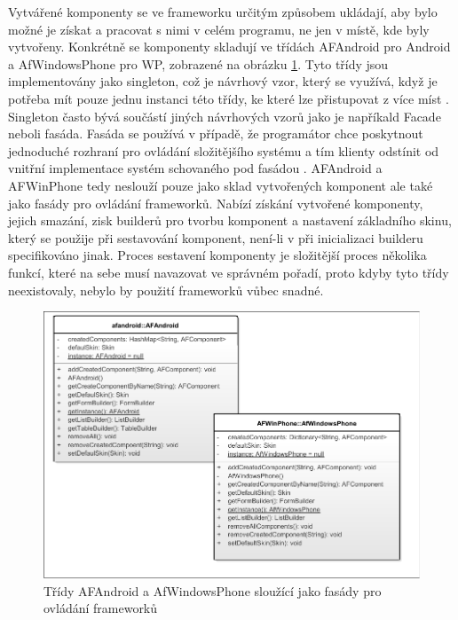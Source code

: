 Vytvářené komponenty se ve frameworku určitým způsobem ukládají, aby bylo možné je získat a pracovat s nimi v celém programu, ne jen v místě, kde byly vytvořeny. Konkrétně se komponenty skladují ve třídách AFAndroid pro Android a AfWindowsPhone pro WP, zobrazené na obrázku \ref{img:facades}. Tyto třídy jsou implementovány jako singleton, což je návrhový vzor, který se využívá, když je potřeba mít pouze jednu instanci této třídy, ke které lze přistupovat z více míst \cite{gamma}. Singleton často bývá součástí jiných návrhových vzorů jako je napříkald Facade neboli fasáda. Fasáda se používá v případě, že programátor chce poskytnout jednoduché rozhraní pro ovládání složitějšího systému a tím klienty odstínit od vnitřní implementace systém schovaného pod fasádou \cite{gamma}. AFAndroid a AFWinPhone tedy neslouží pouze jako sklad vytvořených komponent ale také jako fasády pro ovládání frameworků. Nabízí získání vytvořené komponenty, jejich smazání, zisk builderů pro tvorbu komponent a nastavení základního skinu, který se použije při sestavování komponent, není-li v při inicializaci builderu specifikováno jinak. Proces sestavení komponenty je složitější proces několika funkcí, které na sebe musí navazovat ve správném pořadí, proto kdyby tyto třídy neexistovaly, nebylo by použití frameworků vůbec snadné.

\begin{figure}[h!]
\includegraphics[width=\textwidth]{figures/facades}
\caption{Třídy AFAndroid a AfWindowsPhone sloužící jako fasády pro ovládání frameworků}
\label{img:facades}
\end{figure}

